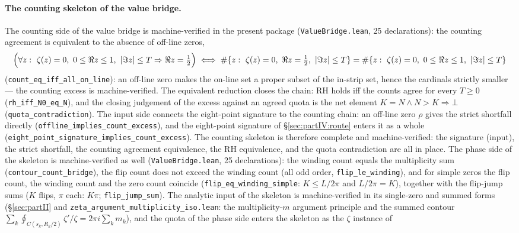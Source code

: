 \documentclass{article}
\newcommand{\zt}{\zeta}
\begin{document}
\paragraph{The counting skeleton of the value bridge.}
The counting side of the value bridge is machine-verified in the
present package (\texttt{ValueBridge.lean}, 25 declarations): the
counting agreement is equivalent to the absence of off-line zeros,
\begin{equation}
  \Bigl(\forall z:\ \zt(z)=0,\ 0\le\Re z\le1,\ |\Im z|\le T
    \Rightarrow \Re z=\tfrac12\Bigr)
  \iff
  \#\{z:\ \zt(z)=0,\ \Re z=\tfrac12,\ |\Im z|\le T\}
  =\#\{z:\ \zt(z)=0,\ 0\le\Re z\le1,\ |\Im z|\le T\}
\end{equation}
(\texttt{count\_eq\_iff\_all\_on\_line}): an off-line zero makes the
on-line set a proper subset of the in-strip set, hence the cardinals
strictly smaller --- the counting excess is machine-verified. The
equivalent reduction closes the chain: RH holds iff the counts agree
for every $T\ge0$ (\texttt{rh\_iff\_N0\_eq\_N}), and the closing
judgement of the excess against an agreed quota is the net element
$K=N\wedge N>K\Rightarrow\bot$
(\texttt{quota\_contradiction}). The input side connects the
eight-point signature to the counting chain: an off-line zero $\rho$
gives the strict shortfall directly
(\texttt{offline\_implies\_count\_excess}), and the eight-point
signature of \S\ref{sec:partIV:route} enters it as a whole
(\texttt{eight\_point\_signature\_implies\_count\_excess}). The
counting skeleton is therefore complete and machine-verified: the
signature (input), the strict shortfall, the counting agreement
equivalence, the RH equivalence, and the quota contradiction are all
in place. The phase side of the skeleton is machine-verified as well
(\texttt{ValueBridge.lean}, 25 declarations): the winding count
equals the multiplicity sum (\texttt{contour\_count\_bridge}), the
flip count does not exceed the winding count (all odd order,
\texttt{flip\_le\_winding}), and for simple zeros the flip count, the
winding count and the zero count coincide
(\texttt{flip\_eq\_winding\_simple}: $K\le L/2\pi$ and
$L/2\pi=K$), together with the flip-jump sums ($K$ flips, $\pi$
each: $K\pi$; \texttt{flip\_jump\_sum}). The analytic input of the
skeleton is machine-verified in its single-zero and summed forms
(\S\ref{sec:partII} and \texttt{zeta\_argument\_multiplicity\_iso.lean}:
the multiplicity-$m$ argument principle and the summed contour
$\sum_k\oint_{C(s_k,R_k/2)}\zt'/\zt=2\pi i\sum_k m_k$), and the
quota of the phase side enters the skeleton as the $\zt$ instance of
\end{document}
